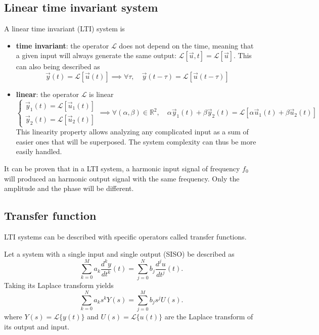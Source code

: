 \subsection{Linear time invariant system}
A linear time invariant (LTI) system is 
\begin{itemize}
	\item \textbf{time invariant}: the operator $\mathcal{L}$ does not depend on the time, meaning that a given input will always generate the same output: $\mathcal{L}[\vec{u},t]=\mathcal{L}[\vec{u}]$. This can also being described as
	\begin{equation}
		\vec{y}(t) = \mathcal{L}[\vec{u}(t)] \implies \forall \tau, \quad \vec{y}(t-\tau) = \mathcal{L}[\vec{u}(t-\tau)]
	\end{equation}
	\item \textbf{linear}: 	the operator  $\mathcal{L}$ is linear
	\begin{equation}
		\begin{cases}
			\vec{y}_1(t) = \mathcal{L}[\vec{u}_1(t)] \\
			\vec{y}_2(t) = \mathcal{L}[\vec{u}_2(t)] 
		\end{cases}
		\implies \forall (\alpha, \beta) \in \mathbb{R}^2, \quad
		\alpha \vec{y}_1(t) + \beta \vec{y}_2(t) = \mathcal{L}[\alpha\vec{u}_1(t)+\beta\vec{u}_2(t)]
	\end{equation}
	This linearity property allows analyzing any complicated input as a sum of easier ones that will be superposed. The system complexity can thus be more easily handled.
\end{itemize}

It can be proven that in a LTI system, a harmonic input signal of frequency $f_0$ will produced an harmonic output signal with the same frequency. Only the amplitude and the phase will be different.

\subsection{Transfer function}
LTI systems can be described with specific operators called transfer functions.

Let a system with a single input and single output (SISO) be described as 
\begin{equation}
	\label{eq:controlth_diff_eq}
	\sum\limits_{k=0}^M a_k \frac{d^k y}{dt^k}(t) = \sum\limits_{j=0}^N b_j \frac{d^j u}{dt^j}(t).
\end{equation}
Taking its Laplace transform yields
\begin{equation}
\sum\limits_{k=0}^N a_k s^k Y(s) = \sum\limits_{j=0}^M b_j s^j U(s).
\end{equation}
where $Y(s) = \mathcal{L}\{y(t)\}$ and $U(s) = \mathcal{L}\{u(t)\}$ are the Laplace transform of its output and input.

